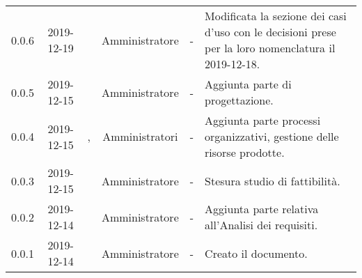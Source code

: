 {\begin{longtable}{ c c  C{2.5cm} c c C{3.5cm}}
0.0.6 & 2019-12-19 & \CE{} & Amministratore & - & Modificata la sezione dei casi d’uso con le decisioni prese per la loro nomenclatura il 2019-12-18. \\

0.0.5 & 2019-12-15 & \SE{} & Amministratore & - & Aggiunta parte di progettazione. \\

0.0.4 & 2019-12-15 & \BR{}, \PF{} & Amministratori & - & Aggiunta parte processi organizzativi, gestione delle risorse prodotte. \\

0.0.3 & 2019-12-15 & \MC{} & Amministratore & - & Stesura studio di fattibilità. \\

0.0.2 & 2019-12-14 & \CE{} & Amministratore & - & Aggiunta parte relativa all’Analisi dei requisiti. \\

0.0.1 & 2019-12-14 & \CE{} & Amministratore & - & Creato il documento. \\
		
\end{longtable}
}